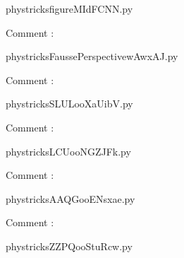     \newcommand{\CaptionFigfigureMIdFCNN}{<+Type your caption here+>}
    \begin{center}
        
    \end{center}
    phystricksfigureMIdFCNN.py

    Comment : 

    \clearpage
    


    \newcommand{\CaptionFigFaussePerspectivewAwxAJ}{<+Type your caption here+>}
    \begin{center}
        
    \end{center}
    phystricksFaussePerspectivewAwxAJ.py

    Comment : 

    \clearpage
    


    \newcommand{\CaptionFigSLULooXaUibV}{<+Type your caption here+>}
    \begin{center}
        
    \end{center}
    phystricksSLULooXaUibV.py

    Comment : 

    \clearpage
    


    \newcommand{\CaptionFigLCUooNGZJFk}{<+Type your caption here+>}
    \begin{center}
        
    \end{center}
    phystricksLCUooNGZJFk.py

    Comment : 

    \clearpage
    


    \newcommand{\CaptionFigAAQGooENsxae}{<+Type your caption here+>}
    \begin{center}
        
    \end{center}
    phystricksAAQGooENsxae.py

    Comment : 

    \clearpage
    


    \newcommand{\CaptionFigZZPQooStuRcw}{<+Type your caption here+>}
    \begin{center}
        
    \end{center}
    phystricksZZPQooStuRcw.py

